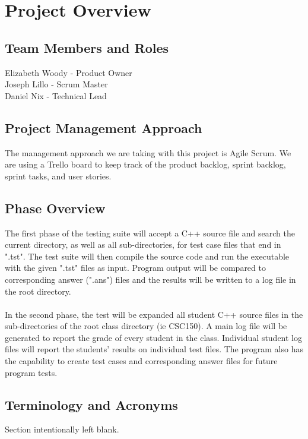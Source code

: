

\chapter{Project Overview}


\section{Team Members and Roles}
Elizabeth Woody - Product Owner
\\Joseph Lillo - Scrum Master
\\Daniel Nix - Technical Lead


\section{Project  Management Approach}
The management approach we are taking with this project is Agile Scrum. We are using a 
Trello board to keep track of the product backlog, sprint backlog, sprint tasks, and user stories.


\section{Phase  Overview}
The first phase of the testing suite will accept a C++ source file and search the current
directory, as well as all sub-directories, for test case files that end in ".tst". The test suite
will then compile the source code and run the executable with the given ".tst" files as input. Program
output will be compared to corresponding answer (".ans") files and the results will be written to a 
log file in the root directory.
\\\\In the second phase, the test will be expanded all student C++ source files in the sub-directories
of the root class directory (ie CSC150). A main log file will be generated to report the grade of every student in the class. Individual student log files will report the students' results on individual test files. The program also has the capability to create test cases and corresponding answer files for future program tests.

\section{Terminology and Acronyms}
Section intentionally left blank.
